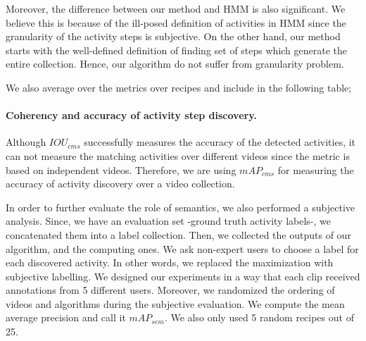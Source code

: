 Moreover, the difference between our method and HMM is also significant. We believe this is because of the ill-posed definition of activities in HMM since the granularity of the activity steps is subjective. On the other hand, our method starts with the well-defined definition of finding set of steps which generate the entire collection. Hence, our algorithm do not suffer from granularity problem.

We also average over the metrics over recipes and include in the following table;
\begin{table}
\caption{Average of $IOU_{cms}$ and $mAP_{cms}$ over recipes.}
{\small
{}}
\normalsize
\end{table}

\paragraph{Coherency and accuracy of activity step discovery.}
Although $IOU_{cms}$ successfully measures the accuracy of the detected activities, it can not measure the matching activities over different videos since the metric is based on independent videos. Therefore, we are using $mAP_{cms}$ for measuring the accuracy of activity discovery over a video collection.

In order to further evaluate the role of semantics, we also performed a subjective analysis. Since, we have an evaluation set -ground truth activity labels-, we concatenated them into a label collection. Then, we collected the outputs of our algorithm, and the computing ones. We ask non-expert users to choose a label for each discovered activity. In other words, we replaced the maximization with subjective labelling. We designed our experiments in a way that each clip received annotations from 5 different users. Moreover, we randomized the ordering of videos and algorithms during the subjective evaluation. We compute the mean average precision and call it $mAP_{sem}$. We also only used 5 random recipes out of 25.

